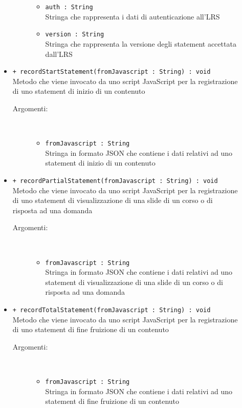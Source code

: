 \documentclass[../Tesi.tex]{subfiles}
\begin{document}
\begin{description}
\begin{itemize}
\begin{description}
\begin{itemize}
						\item \texttt{auth : String}\\
						Stringa che rappresenta i dati di autenticazione all'LRS

						\item \texttt{version : String}\\
						Stringa che rappresenta la versione degli statement accettata dall'LRS
					\end{itemize}
				\end{description}

				\item \texttt{+ recordStartStatement(fromJavascript : String) : void}\\
				Metodo che viene invocato da uno script JavaScript per la registrazione di uno statement di inizio di un contenuto
				\begin{description}
					\item[Argomenti:] \
					\begin{itemize}
						\item \texttt{fromJavascript : String}\\
						Stringa in formato JSON che contiene i dati relativi ad uno statement di inizio di un contenuto
					\end{itemize}
				\end{description}

				\item \texttt{+ recordPartialStatement(fromJavascript : String) : void}\\
				Metodo che viene invocato da uno script JavaScript per la registrazione di uno statement di visualizzazione di una slide di un corso o di risposta ad una domanda
				\begin{description}
					\item[Argomenti:] \
					\begin{itemize}
						\item \texttt{fromJavascript : String}\\
						Stringa in formato JSON che contiene i dati relativi ad uno statement di visualizzazione di una slide di un corso o di risposta ad una domanda
					\end{itemize}
				\end{description}

				\item \texttt{+ recordTotalStatement(fromJavascript : String) : void}\\
				Metodo che viene invocato da uno script JavaScript per la registrazione di uno statement di fine fruizione di un contenuto
				\begin{description}
					\item[Argomenti:] \
					\begin{itemize}
						\item \texttt{fromJavascript : String}\\
						Stringa in formato JSON che contiene i dati relativi ad uno statement di fine fruizione di un contenuto
					\end{itemize}
				\end{description}


\end{itemize}
\end{description}
\end{document}

